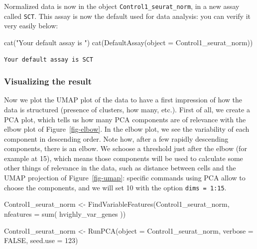 \documentclass[
  letterpaper,
  DIV=11,
  numbers=noendperiod]{scrartcl}
\newenvironment{Shaded}{\begin{snugshade}}{\end{snugshade}}
\newcommand{\AttributeTok}[1]{\textcolor[rgb]{0.40,0.45,0.13}{#1}}
\newcommand{\ConstantTok}[1]{\textcolor[rgb]{0.56,0.35,0.01}{#1}}
\newcommand{\DecValTok}[1]{\textcolor[rgb]{0.68,0.00,0.00}{#1}}
\newcommand{\FunctionTok}[1]{\textcolor[rgb]{0.28,0.35,0.67}{#1}}
\newcommand{\NormalTok}[1]{\textcolor[rgb]{0.00,0.23,0.31}{#1}}
\newcommand{\OtherTok}[1]{\textcolor[rgb]{0.00,0.23,0.31}{#1}}
\newcommand{\StringTok}[1]{\textcolor[rgb]{0.13,0.47,0.30}{#1}}
\begin{document}
Normalized data is now in the object \texttt{Control1\_seurat\_norm}, in
a new assay called \texttt{SCT}. This assay is now the default used for
data analysis: you can verify it very easily below:

\begin{Shaded}
\begin{Highlighting}[]
\FunctionTok{cat}\NormalTok{(}\StringTok{"Your default assay is "}\NormalTok{)}
\FunctionTok{cat}\NormalTok{(}\FunctionTok{DefaultAssay}\NormalTok{(}\AttributeTok{object =}\NormalTok{ Control1\_seurat\_norm))}
\end{Highlighting}
\end{Shaded}

\begin{verbatim}
Your default assay is SCT
\end{verbatim}

\subsubsection{Visualizing the result}\label{visualizing-the-result}

Now we plot the UMAP plot of the data to have a first impression of how
the data is structured (presence of clusters, how many, etc.). First of
all, we create a PCA plot, which tells us how many PCA components are of
relevance with the elbow plot of Figure~\ref{fig-elbow}. In the elbow
plot, we see the variability of each component in descending order. Note
how, after a few rapidly descending components, there is an elbow. We
schoose a threshold just after the elbow (for example at 15), which
means those components will be used to calculate some other things of
relevance in the data, such as distance between cells and the UMAP
projection of Figure~\ref{fig-umap}: specific commands using PCA allow
to choose the components, and we will set 10 with the option
\texttt{dims\ =\ 1:15}.

\begin{Shaded}
\begin{Highlighting}[]
\NormalTok{Control1\_seurat\_norm }\OtherTok{\textless{}{-}} \FunctionTok{FindVariableFeatures}\NormalTok{(Control1\_seurat\_norm,}
                                                     \AttributeTok{nfeatures =} \FunctionTok{sum}\NormalTok{( hvighly\_var\_genes ))}
\end{Highlighting}
\end{Shaded}

\begin{Shaded}
\begin{Highlighting}[]
\NormalTok{Control1\_seurat\_norm }\OtherTok{\textless{}{-}} \FunctionTok{RunPCA}\NormalTok{(}\AttributeTok{object =}\NormalTok{ Control1\_seurat\_norm, }
                                        \AttributeTok{verbose =} \ConstantTok{FALSE}\NormalTok{, }\AttributeTok{seed.use =} \DecValTok{123}\NormalTok{)}
\end{Highlighting}
\end{Shaded}
\end{document}

